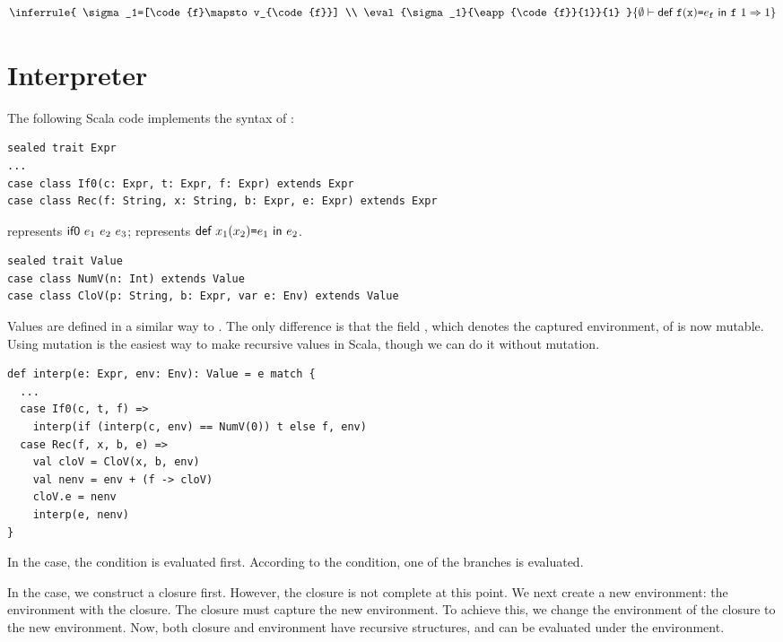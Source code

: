 \[
\inferrule
{
  \sigma_1=[\code{f}\mapsto v_{\code{f}}]
  \\
  \eval{\sigma_1}{\eapp{\code{f}}{1}}{1}
}
{ \evale{\erec{\code{f}}{\cx}{e_{\code{f}}}{\eapp{\code{f}}{1}}}{1} }
\]

\section{Interpreter}

The following Scala code implements the syntax of \lang:

\begin{verbatim}
sealed trait Expr
...
case class If0(c: Expr, t: Expr, f: Expr) extends Expr
case class Rec(f: String, x: String, b: Expr, e: Expr) extends Expr
\end{verbatim}

 represents $\textsf{if0}\ e_1\ e_2\ e_3$;
 represents $\textsf{def}\ x_1(x_2)\texttt{=} e_1\ \textsf{in}\ e_2$.

\begin{verbatim}
sealed trait Value
case class NumV(n: Int) extends Value
case class CloV(p: String, b: Expr, var e: Env) extends Value
\end{verbatim}

Values are defined in a similar way to \plang. The only difference is that the
field , which denotes the captured environment, of  is now mutable.
Using mutation is the easiest way to make recursive values in Scala, though we
can do it without mutation.

\begin{verbatim}
def interp(e: Expr, env: Env): Value = e match {
  ...
  case If0(c, t, f) =>
    interp(if (interp(c, env) == NumV(0)) t else f, env)
  case Rec(f, x, b, e) =>
    val cloV = CloV(x, b, env)
    val nenv = env + (f -> cloV)
    cloV.e = nenv
    interp(e, nenv)
}
\end{verbatim}

In the  case, the condition is evaluated first. According to the
condition, one of the branches is evaluated.

In the  case, we
construct a closure first. However, the closure is not complete at this point.
We next create a new environment: the environment with the closure. The closure
must capture the new environment. To achieve this, we change the environment of
the closure to the new environment. Now, both closure and environment have
recursive structures, and  can be evaluated under the environment.

